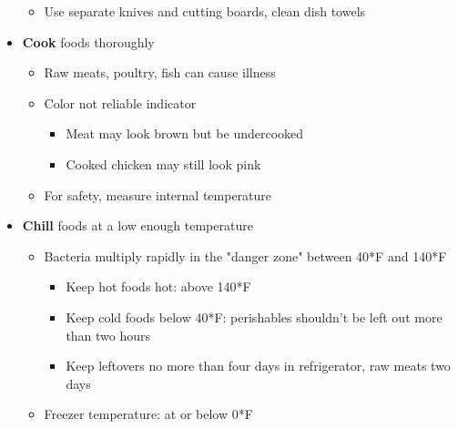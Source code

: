 \documentclass[12pt]{article}
\begin{document}
\begin{itemize}
\begin{itemize}
                        \item Use separate knives and cutting boards, clean dish towels
                    \end{itemize}
                \item \textbf{Cook} foods thoroughly
                    \begin{itemize}
                        \item Raw meats, poultry, fish can cause illness
                        \item Color not reliable indicator
                            \begin{itemize}
                                \item Meat may look brown but be undercooked
                                \item Cooked chicken may still look pink
                            \end{itemize}
                        \item For safety, measure internal temperature
                    \end{itemize}
                \item \textbf{Chill} foods at a low enough temperature
                    \begin{itemize}
                        \item Bacteria multiply rapidly in the "danger zone" between 40*F and 140*F
                            \begin{itemize}
                                \item Keep hot foods hot: above 140*F
                                \item Keep cold foods below 40*F: perishables shouldn't be left out more than two hours
                                \item Keep leftovers no more than four days in refrigerator, raw meats two days
                            \end{itemize}    
                        \item Freezer temperature: at or below 0*F
                    \end{itemize}
            \end{itemize}
\end{document}
